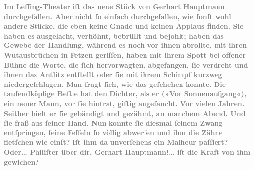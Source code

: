 \pstart
           \textcolor{gray}{\textbf{Im Leſſing-Theater iſt das
                  neue Stück von Gerhart Hauptmann durchgefallen. Aber nicht
                  ſo einfach durchgefallen, wie ſonſt wohl andere Stücke, die eben keine Gnade und
                  keinen Applaus finden. Sie haben es ausgelacht, verhöhnt, bebrüllt und bejohlt;
                  haben das Gewebe der Handlung, während es noch vor ihnen abrollte, mit ihren
                  Wutausbrüchen in Fetzen geriſſen, haben mit ihrem Spott bei offener Bühne die
                  Worte, die ſich hervorwagten, abgefangen, ſie verdreht und ihnen das Antlitz
                  entſtellt oder ſie mit ihrem Schimpf kurzweg niedergeſchlagen. Man fragt ſich, wie
                  das geſchehen konnte. Die tauſendköpfige Beſtie hat den Dichter, als er (»Vor Sonnenaufgang«), ein neuer Mann, vor ſie
                  hintrat, giftig angefaucht. Vor vielen Jahren. Seither hielt er ſie gebändigt und
                  gezähmt, an manchem Abend. Und ſie fraß aus ſeiner Hand. Nun konnte ſie diesmal
                  ſeinem Zwang entſpringen, ſeine Feſſeln ſo völlig abwerfen und ihm die Zähne
                  fletſchen wie einſt? Iſt ihm da unverſehens ein Malheur paſſiert? Oder{\dots} Philiſter über dir, Gerhart Hauptmann!{\dots} iſt die Kraft von ihm
                  gewichen?}}\pend
           {\vspace{1\baselineskip}}
\pstart
